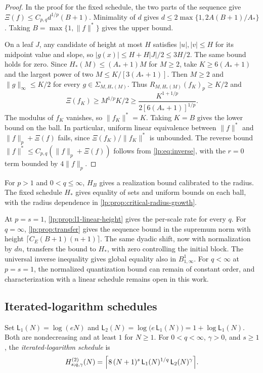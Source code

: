 \documentclass[11pt,a4paper]{article}
\begin{document}
\begin{proof}
In the proof for the fixed schedule, the two parts of the sequence give $\Xi(f)\le C_{p,q}d^{1/p}(B+1)$. Minimality of $d$ gives $d\le2\max\{1,2A(B+1)/A_*\}$. Taking $B=\max\{1,\|f\|^*\}$ gives the upper bound.

On a leaf $J$, any candidate of height at most $H$ satisfies $|u|,|v|\le H$ for its midpoint value and slope, so $|g(x)|\le H+H|J|/2\le3H/2$. The same bound holds for zero. Since $H_*(M)\le(A_*+1)M$ for $M\ge2$, take $K\ge6(A_*+1)$ and the largest power of two $M\le K/[3(A_*+1)]$. Then $M\ge2$ and $\|g\|_\infty\le K/2$ for every $g\in\Sigma_{M,H_*(M)}$. Thus $R_{M,H_*(M)}(f_K)_p\ge K/2$ and
\[
 \Xi(f_K)\ge M^{1/p}K/2\ge \frac{K^{1+1/p}}{2[6(A_*+1)]^{1/p}}.
\]
The modulus of $f_K$ vanishes, so $\|f_K\|^*=K$. Taking $K=B$ gives the lower bound on the ball. In particular, uniform linear equivalence between $\|f\|^*$ and $\|f\|_p+\Xi(f)$ fails, since $\Xi(f_K)/\|f_K\|^*$ is unbounded. The reverse bound $\|f\|^*\le C_{p,q}(\|f\|_p+\Xi(f))$ follows from \eqref{lp:eq:inverse}, with the $r=0$ term bounded by $4\|f\|_p$.
\end{proof}

\begin{observacao}
\label{lp:obs:critical-scope}
For $p>1$ and $0<q\le\infty$, $H_B$ gives a realization bound calibrated to the radius. The fixed schedule $H_*$ gives equality of sets and uniform bounds on each ball, with the radius dependence in \cref{lp:prop:critical-radius-growth}.

At $p=s=1$, \cref{lp:prop:l1-linear-height} gives the per-scale rate for every $q$. For $q=\infty$, \cref{lp:prop:transfer} gives the sequence bound in the supremum norm with height $\lceil C_E(B+1)(n+1)\rceil$. The same dyadic shift, now with normalization by $dn$, transfers the bound to $H_*$, with zero controlling the initial block. The universal inverse inequality gives global equality also in $B^1_{1,\infty}$. For $q<\infty$ at $p=s=1$, the normalized quantization bound can remain of constant order, and characterization with a linear schedule remains open in this work.
\end{observacao}

\subsection{Iterated-logarithm schedules}
\label{lp:sec:loglog}

Set $\mathsf L_1(N)=\log(eN)$ and $\mathsf L_2(N)=\log\bigl(e\,\mathsf L_1(N)\bigr)=1+\log\mathsf L_1(N)$. Both are nondecreasing and at least $1$ for $N\ge1$. For $0<q<\infty$, $\gamma>0$, and $s\ge1$, the \emph{iterated-logarithm schedule} is
\begin{equation}
 H^{(2)}_{s;q,\gamma}(N)=\Bigl\lceil8\,(N+1)^{s}\,\mathsf L_1(N)^{1/q}\,\mathsf L_2(N)^{\gamma}\Bigr\rceil .
 \label{lp:eq:loglog}
\end{equation}
\end{document}
